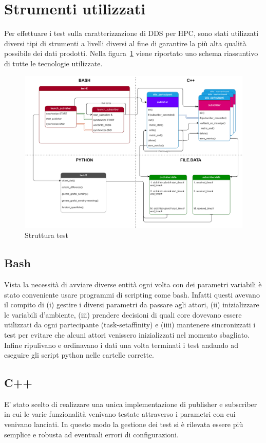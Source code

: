 \section{Strumenti utilizzati}%
Per effettuare i test sulla caratterizzazione di DDS per HPC, sono stati utilizzati diversi tipi di strumenti a livelli diversi al fine di garantire la più alta qualità possibile dei dati prodotti. Nella figura~\ref{fig:schema_global} viene riportato uno schema riassuntivo di tutte le tecnologie utilizzate.
\begin{figure}[H]
    \centering
    \includegraphics[width=\textwidth]{./img/schema_test_globale.drawio.png}
    \caption{Struttura test}\label{fig:schema_global}
\end{figure}

\subsection{Bash}\label{sec:Shell}
Vista la necessità di avviare diverse entità ogni volta con dei parametri variabili è stato conveniente usare programmi di scripting come bash. Infatti questi avevano il compito di (i) gestire i diversi parametri da passare agli attori, (ii) inizializzare le variabili d'ambiente, (iii) prendere decisioni di quali core dovevano essere utilizzati da ogni partecipante (task-setaffinity) e (iiii) mantenere sincronizzati i test per evitare che alcuni attori venissero inizializzati nel momento sbagliato. Infine ripulivano e ordinavano i dati una volta terminati i test andando ad eseguire gli script python nelle cartelle corrette.
\subsection{C++}
E' stato scelto di realizzare una unica implementazione di publisher e subscriber in cui le varie funzionalità venivano testate attraverso i parametri con cui venivano lanciati. In questo modo la gestione dei test si è rilevata essere più semplice e robusta ad eventuali errori di configurazioni.
